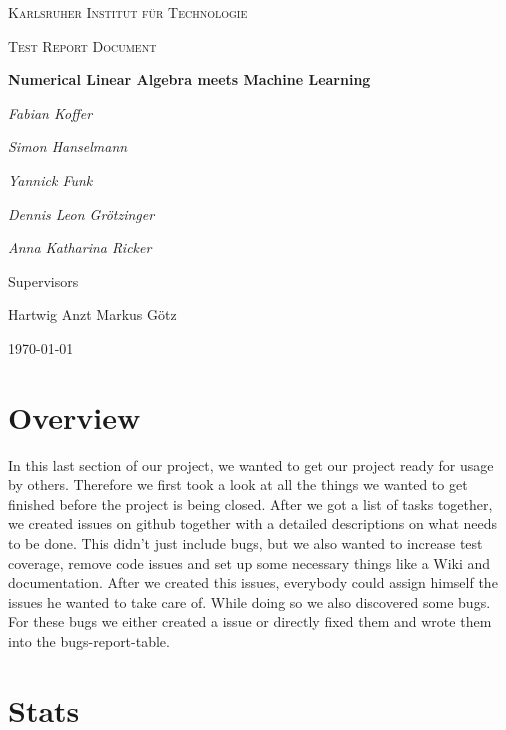 \documentclass[parskip=full]{scrartcl}
\begin{document}
\begin{titlepage}
\centering
{\scshape\LARGE Karlsruher Institut für Technologie\par}
\vspace{1cm}
{\scshape\Large Test Report Document \par}
\vspace{1.5cm}
{\huge\bfseries Numerical Linear Algebra meets Machine Learning \par}
\vspace {2cm}

{\Large\itshape Fabian Koffer\par}
{\Large\itshape Simon Hanselmann\par}
{\Large\itshape Yannick Funk\par}
{\Large\itshape Dennis Leon Gr\"{o}tzinger\par}
{\Large\itshape Anna Katharina Ricker\par}

\vfill
Supervisors\par
Hartwig Anzt
Markus G\"{o}tz


\vfill
{\large\today\par}
\end{titlepage}

\tableofcontents
\newpage

\section{Overview}

In this last section of our project, we wanted to get our project ready for usage by others. 
Therefore we first took a look at all the things we wanted to get finished before the project is being closed.
After we got a list of tasks together, we created issues on \gls{github} together with a detailed descriptions on what needs to be done.
This didn't just include bugs, but we also wanted to increase test coverage, remove code issues and set up some necessary things like a Wiki and documentation.
After we created this issues, everybody could assign himself the issues he wanted to take care of.
While doing so we also discovered some bugs.
For these bugs we either created a issue or directly fixed them and wrote them into the bugs-report-table.

\newpage

\section{Stats}
\end{document}
